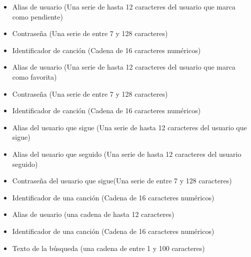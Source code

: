 \begin{itemize}
\item Alias de usuario (Una serie de hasta 12 caracteres del usuario que marca como pendiente)
\item Contraseña (Una serie de entre 7 y 128 caracteres)
\item Identificador de canción (Cadena de 16 caracteres numéricos)
\end{itemize}

\begin{itemize}
\item Alias de usuario (Una serie de hasta 12 caracteres del usuario que marca como favorita)
\item Contraseña (Una serie de entre 7 y 128 caracteres)
\item Identificador de canción (Cadena de 16 caracteres numéricos)
\end{itemize}

\begin{itemize}
\item Alias del usuario que sigue (Una serie de hasta 12 caracteres del usuario que sigue)
\item Alias del usuario que seguido (Una serie de hasta 12 caracteres del usuario seguido)
\item Contraseña del usuario que sigue(Una serie de entre 7 y 128 caracteres)
\end{itemize}

\begin{itemize}
\item Identificador de una canción (Cadena de 16 caracteres numéricos)
\end{itemize}

\begin{itemize}
\item Alias de usuario (una cadena de hasta 12 caracteres)
\item Identificador de una canción (Cadena de 16 caracteres numéricos)
\end{itemize}



\begin{itemize}
\item Texto de la búsqueda (una cadena de entre 1 y 100 caracteres)
\end{itemize}


